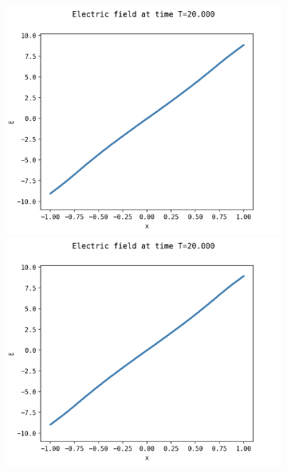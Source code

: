 \documentclass{article}
\numberwithin{equation}{section}
\newcommand{\imh}{\textheight} %
\newcommand{\imw}{\textwidth} %
\begin{document}
\begin{figure}
	\centering
	\newcommand{\rootSL}{../code_SL/}
	\newcommand{\rootFD}{../temp_res_DF/}
	\newcommand{\dirSL}{run_comp_long_time_2sp_Nx1000_Nvi2001_Nve2001_Nt100000}
	\newcommand{\dirFD}{run_comp_long_time_2sp_Nx200_Nv400_Nt2500000}
	
	\renewcommand{\imh}{0.24\textheight}
	\renewcommand{\imw}{0.3\linewidth}
	
	\begin{subfigure}{\textwidth}
		\centering
		\includegraphics[height=\imh,width=\imw]{images/ET20_run5af.png}
		\includegraphics[height=\imh,width=\imw]{images/ET20_run5af_2.png}

\end{subfigure}
\end{figure}
\end{document}
